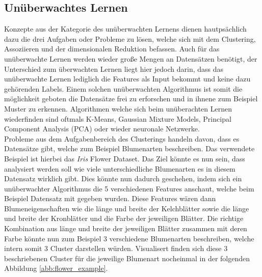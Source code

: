 \documentclass[]{iat}
\begin{document}
\subsection{Unüberwachtes Lernen} \label{sec:unueberwachtes_lernen}
Konzepte aus der Kategorie des unüberwachten Lernens dienen hautpsächlich dazu die drei Aufgaben oder Probleme zu lösen, welche sich mit dem Clustering, Assoziieren und der dimensionalen Reduktion befassen. Auch für das unüberwachte Lernen werden wieder große Mengen an Datensätzen benötigt, der Unterschied zum überwachten Lernen liegt hier jedoch darin, dass das unüberwachte Lernen lediglich die Features als Input bekommt und keine dazu gehörenden Labels. Einem solchen unüberwachten Algorithmus ist somit die möglichkeit geboten die Datensätze frei zu erforschen und in ihnene zum Beispiel Muster zu erkennen. Algorithmen welche sich beim unüberachten Lernen wiederfinden sind oftmals K-Means, Gaussian Mixture Models, Principal Component Analysis (PCA) oder wieder neuronale Netzwerke.\\
Probleme aus dem Aufgabenbereich des Clusterings handeln davon, dass es Datensätze gibt, welche zum Beispiel Blumenarten beschreiben. Das verwendete Beispiel ist hierbei das \textit{Iris} Flower Dataset. Das Ziel könnte es nun sein, dass analysiert werden soll wie viele unterschiedliche Blumenarten es in diesem Datensatz wirklich gibt. Dies könnte nun dadurch geschehen, indem sich ein unüberwachter Algorithmus die 5 verschiedenen Features anschaut, welche beim Beispiel Datensatz mit gegeben wurden. Diese Features wären dann Blumeneigenschaften wie die länge und breite der Kelchblätter sowie die länge und breite der Kronblätter und die Farbe der jeweiligen Blätter. Die richtige Kombination aus länge und breite der jeweiligen Blätter zusammen mit deren Farbe könnte nun zum Beispiel 3 verschiedene Blumenarten beschreiben, welche intern somit 3 Cluster darstellen würden. Visualisert finden sich diese 3 beschriebenen Cluster für die jeweilige Blumenart nocheinmal in der folgenden Abbildung \ref{abb:flower_example}.
\end{document}
